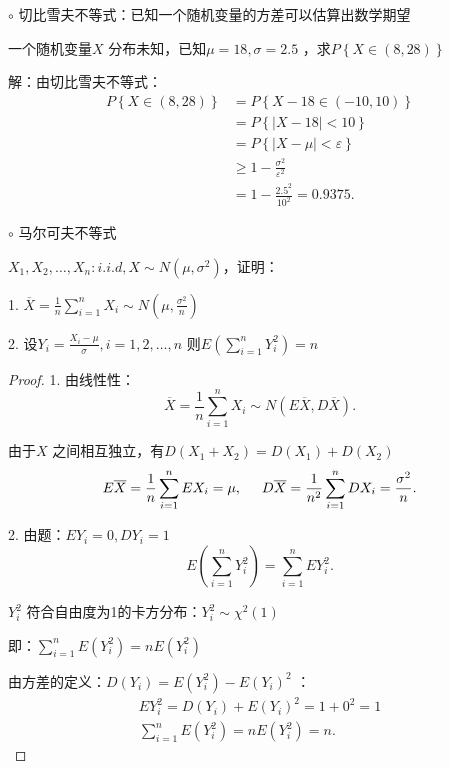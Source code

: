 $\circ$ 切比雪夫不等式：已知一个随机变量的方差可以估算出数学期望
\begin{question}
    一个随机变量$X$ 分布未知，已知$\mu=18,\sigma=2.5$ ，求$P\left\{ X\in (8,28) \right\} $
\end{question}
解：由切比雪夫不等式：
\begin{align*}
    P\left\{ X\in (8,28) \right\} &= P\left\{ X-18\in (-10,10) \right\}  \\
    &= P\left\{ \left| X-18 \right| <10 \right\}  \\
    &= P\left\{ \left| X-\mu \right| <\varepsilon \right\}  \\
    &\ge 1-\frac{\sigma^2}{\varepsilon^2} \\
    &= 1-\frac{2.5^2}{10^2} =0.9375 
.\end{align*}

$\circ$ 马尔可夫不等式

\begin{eg}
    $X_1,X_2,\ldots,X_n: i.i.d,X\sim N\left( \mu,\sigma^2 \right) $，证明：

    1. $\overline{X}={\frac{1}{n} \sum_{i=1}^{n}X_i\sim N\left( \mu,\frac{\sigma^2}{n}  \right) }$

    2. 设$Y_i={\frac{X_i-\mu}{\sigma}} ,i=1,2,\ldots,n$ 则$E\left( {\sum_{i=1}^{n}} Y_i^2 \right) =n$
\end{eg}
\begin{proof}
    1. 由线性性：\[
        \overline{X}=\frac{1}{n} \sum_{i=1}^{n} X_i\sim N\left( E\overline{X},D\overline{X} \right) 
    .\] 

    由于$X$ 之间相互独立，有$D\left( X_1+X_2 \right) =D\left( X_1 \right) +D\left( X_2 \right) $
    \[
        E\overline{X}=\frac{1}{n} \sum_{i=1}^{n} EX_i=\mu, \hspace{0.5cm} D\overline{X}=\frac{1}{n^2} \sum_{i=1}^{n} DX_i=\frac{\sigma^2}{n} 
    .\] 

    2. 由题：$EY_i=0,DY_i=1$ 
    \[
        E\left( \sum_{i=1}^{n} Y_i^2 \right) =\sum_{i=1}^{n} EY_i^2
    .\] 
    \begin{notation}
        $Y_i^2$ 符合自由度为1的卡方分布：$Y_i^2\sim \chi^2\left( 1 \right) $
    \end{notation}
    
    即：${\sum_{i=1}^{n} E\left( Y_i^2 \right) =nE\left( Y_i^2 \right) }$

    由方差的定义：$D\left( Y_i \right) =E\left( Y_i^2 \right) -E\left( Y_i \right) ^2$ ：
\begin{align*}
    EY_i^2=D\left( Y_i \right) +E\left( Y_i \right) ^2=1+0^2=1\\
    \sum_{i=1}^{n} E\left( Y_i^2 \right) =nE\left( Y_i^2 \right) =n
.\end{align*}
\end{proof}

